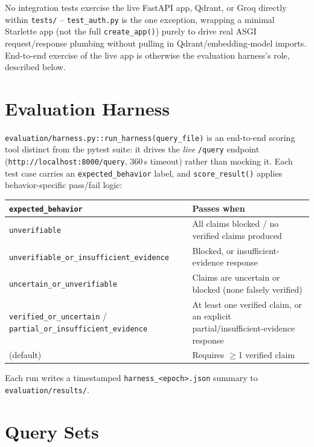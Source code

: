 \documentclass[11pt,a4paper]{report}
\newcommand{\code}[1]{\texttt{#1}}
\newcommand{\file}[1]{\texttt{\small #1}}
\begin{document}
No integration tests exercise the live FastAPI app, Qdrant, or Groq directly within
\file{tests/} -- \file{test\_auth.py} is the one exception, wrapping a minimal
Starlette app (not the full \code{create\_app()}) purely to drive real ASGI
request/response plumbing without pulling in Qdrant/embedding-model imports.
End-to-end exercise of the live app is otherwise the evaluation harness's role,
described below.

\section{Evaluation Harness}

\file{evaluation/harness.py}\code{::run\_harness(query\_file)} is an end-to-end scoring
tool distinct from the pytest suite: it drives the \emph{live} \code{/query} endpoint
(\code{http://localhost:8000/query}, 360\,s timeout) rather than mocking it. Each test
case carries an \code{expected\_behavior} label, and \code{score\_result()} applies
behavior-specific pass/fail logic:

\begin{center}
\begin{tabular}{@{}ll@{}}
\toprule
\textbf{\code{expected\_behavior}} & \textbf{Passes when} \\
\midrule
\code{unverifiable} & All claims blocked / no verified claims produced \\
\code{unverifiable\_or\_insufficient\_evidence} & Blocked, or insufficient-evidence
response \\
\code{uncertain\_or\_unverifiable} & Claims are uncertain or blocked (none falsely
verified) \\
\code{verified\_or\_uncertain} / \code{partial\_or\_insufficient\_evidence} & At least
one verified claim, or an explicit partial/insufficient-evidence response \\
(default) & Requires $\geq$1 verified claim \\
\bottomrule
\end{tabular}
\end{center}

Each run writes a timestamped \file{harness\_<epoch>.json} summary to
\file{evaluation/results/}.

\section{Query Sets}
\end{document}

